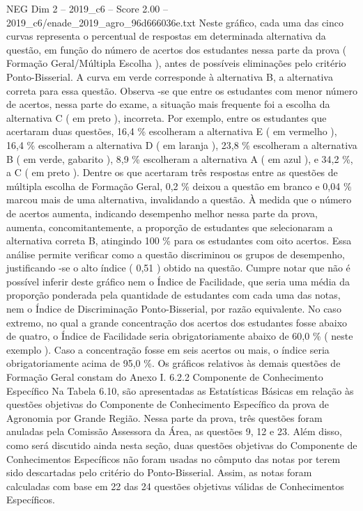 \begin{textsample}{NEG Dim 2 – 2019\_c6 – Score 2.00 – 2019\_c6/enade\_2019\_agro\_96d666036e.txt}
Neste gráfico, cada uma das cinco curvas representa o percentual de respostas em determinada alternativa da questão, em função do número de acertos dos estudantes nessa parte da prova ( Formação Geral/Múltipla Escolha ), antes de possíveis eliminações pelo critério Ponto-Bisserial.
A curva em verde corresponde à alternativa B, a alternativa correta para essa questão.
Observa -se que entre os estudantes com menor número de acertos, nessa parte do exame, a situação mais frequente foi a escolha da alternativa C ( em preto ), incorreta.
Por exemplo, entre os estudantes que acertaram duas questões, 16,4 \% escolheram a alternativa E ( em vermelho ), 16,4 \% escolheram a alternativa D ( em laranja ), 23,8 \% escolheram a alternativa B ( em verde, gabarito ), 8,9 \% escolheram a alternativa A ( em azul ), e 34,2 \%, a C ( em preto ).
Dentre os que acertaram três respostas entre as questões de múltipla escolha de Formação Geral, 0,2 \% deixou a questão em branco e 0,04 \% marcou mais de uma alternativa, invalidando a questão.
À medida que o número de acertos aumenta, indicando desempenho melhor nessa parte da prova, aumenta, concomitantemente, a proporção de estudantes que selecionaram a alternativa correta B, atingindo 100 \% para os estudantes com oito acertos.
Essa análise permite verificar como a questão discriminou os grupos de desempenho, justificando -se o alto índice ( 0,51 ) obtido na questão.
Cumpre notar que não é possível inferir deste gráfico nem o Índice de Facilidade, que seria uma média da proporção ponderada pela quantidade de estudantes com cada uma das notas, nem o Índice de Discriminação Ponto-Bisserial, por razão equivalente.
No caso extremo, no qual a grande concentração dos acertos dos estudantes fosse abaixo de quatro, o Índice de Facilidade seria obrigatoriamente abaixo de 60,0 \% ( neste exemplo ).
Caso a concentração fosse em seis acertos ou mais, o índice seria obrigatoriamente acima de 95,0 \%.
Os gráficos relativos às demais questões de Formação Geral constam do Anexo I. 6.2.2 Componente de Conhecimento Específico Na Tabela 6.10, são apresentadas as Estatísticas Básicas em relação às questões objetivas do Componente de Conhecimento Específico da prova de Agronomia por Grande Região.
Nessa parte da prova, três questões foram anuladas pela Comissão Assessora da Área, as questões 9, 12 e 23.
Além disso, como será discutido ainda nesta seção, duas questões objetivas do Componente de Conhecimentos Específicos não foram usadas no cômputo das notas por terem sido descartadas pelo critério do Ponto-Bisserial.
Assim, as notas foram calculadas com base em 22 das 24 questões objetivas válidas de Conhecimentos Específicos.

\end{textsample}

